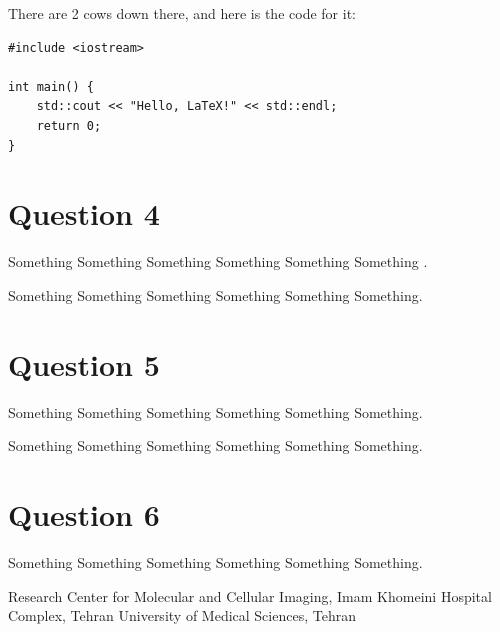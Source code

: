 \documentclass{article}
\begin{document}
\begin{solutionbox}
  There are 2 cows down there, and here is the code for it:
\end{solutionbox}

\begin{codebox}
\begin{verbatim}
#include <iostream>

int main() {
    std::cout << "Hello, LaTeX!" << std::endl;
    return 0;
}
\end{verbatim}
\end{codebox}

\section*{Question 4}
\begin{questionbox}
Something Something Something Something Something Something .
\end{questionbox}

\begin{solutionbox}
  Something Something Something Something Something Something.
\end{solutionbox}

\section*{Question 5}
\begin{questionbox}
Something Something Something Something Something Something.
\end{questionbox}

\begin{solutionbox}
  Something Something Something Something Something Something.
\end{solutionbox}

\section*{Question 6}
\begin{questionbox}
Something Something Something Something Something Something.
\end{questionbox}

\begin{solutionbox}
  Research Center for Molecular and Cellular Imaging, Imam Khomeini Hospital Complex, Tehran University of Medical Sciences, Tehran
\end{solutionbox}

\end{document}
